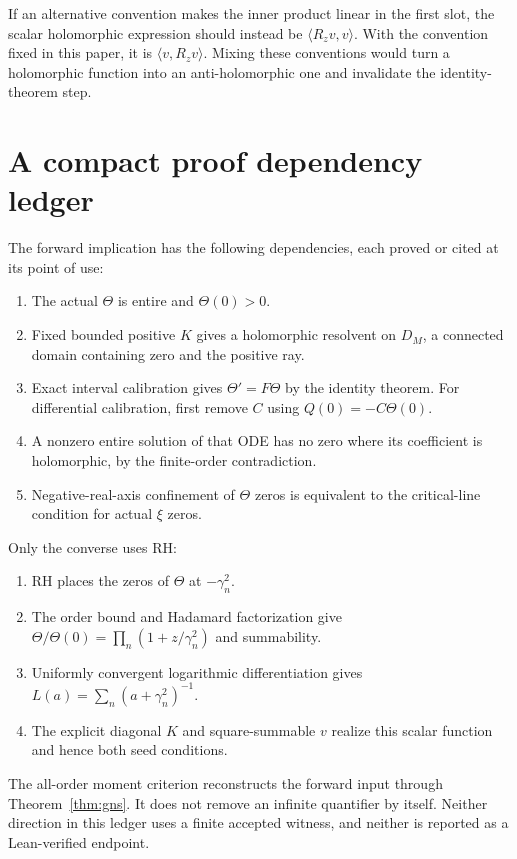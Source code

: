 \documentclass[11pt,a4paper]{article}
\numberwithin{equation}{section}
\theoremstyle{definition}
\theoremstyle{remark}
\newcommand{\ip}[2]{\langle #1,#2\rangle}
\begin{document}
If an alternative convention makes the inner product linear in the
first slot, the scalar holomorphic expression should instead be
$\ip{R_zv}{v}$. With the convention fixed in this paper, it is
$\ip v{R_zv}$. Mixing these conventions would turn a holomorphic
function into an anti-holomorphic one and invalidate the identity-theorem
step.

\section[Proof dependencies]{A compact proof dependency ledger}\label{app:ledger}

The forward implication has the following dependencies, each proved
or cited at its point of use:
\begin{enumerate}[label=\textbf{F\arabic*.},leftmargin=2.8em]
\item The actual $\Theta$ is entire and $\Theta(0)>0$.
\item Fixed bounded positive $K$ gives a holomorphic resolvent on
      $D_M$, a connected domain containing zero and the positive ray.
\item Exact interval calibration gives $\Theta'=F\Theta$ by the
      identity theorem. For differential calibration, first remove
      $C$ using $Q(0)=-C\Theta(0)$.
\item A nonzero entire solution of that ODE has no zero where its
      coefficient is holomorphic, by the finite-order contradiction.
\item Negative-real-axis confinement of $\Theta$ zeros is equivalent
      to the critical-line condition for actual $\xi$ zeros.
\end{enumerate}
Only the converse uses RH:
\begin{enumerate}[label=\textbf{R\arabic*.},leftmargin=2.8em]
\item RH places the zeros of $\Theta$ at $-\gamma_n^2$.
\item The order bound and Hadamard factorization give
      $\Theta/\Theta(0)=\prod_n(1+z/\gamma_n^2)$ and summability.
\item Uniformly convergent logarithmic differentiation gives
      $L(a)=\sum_n(a+\gamma_n^2)^{-1}$.
\item The explicit diagonal $K$ and square-summable $v$ realize this
      scalar function and hence both seed conditions.
\end{enumerate}
The all-order moment criterion reconstructs the forward input through
Theorem~\ref{thm:gns}. It does not remove an infinite quantifier by
itself. Neither direction in this ledger uses a finite accepted
witness, and neither is reported as a Lean-verified endpoint.
\end{document}
